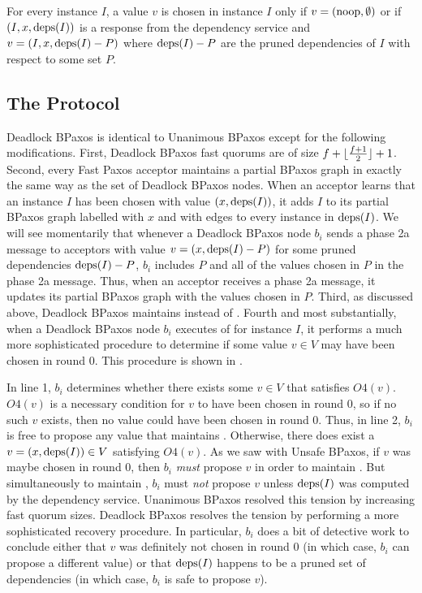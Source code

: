 \begin{invariant}
  For every instance $I$, a value $v$ is chosen in instance $I$ only if $v =
  (\text{noop}, \emptyset)$ or if $(I, x, \text{deps}(I))$ is a response from the
  dependency service and $v = (I, x, \text{deps}(I) - P)$ where $\text{deps}(I) - P$ are
  the pruned dependencies of $I$ with respect to some set $P$.
\end{invariant}

\subsection{The Protocol}
Deadlock BPaxos is identical to Unanimous BPaxos except for the
following modifications.
%
First, Deadlock BPaxos fast quorums are of size $f + \lfloor\frac{f + 1}{2}\rfloor + 1$.
%
Second, every Fast Paxos acceptor maintains a partial BPaxos graph in exactly
the same way as the set of Deadlock BPaxos nodes. When an acceptor learns that
an instance $I$ has been chosen with value $(x, \text{deps}(I))$, it adds $I$ to its
partial BPaxos graph labelled with $x$ and with edges to every instance in
$\text{deps}(I)$. We will see momentarily that whenever a Deadlock BPaxos node $b_i$
sends a phase 2a message to acceptors with value $v = (x, \text{deps}(I) - P)$ for
some pruned dependencies $\text{deps}(I) - P$, $b_i$ includes $P$ and all of the
values chosen in $P$ in the phase 2a message. Thus, when an acceptor receives a
phase 2a message, it updates its partial BPaxos graph with the values chosen in
$P$.
%
Third, as discussed above, Deadlock BPaxos maintains
 instead of .
%
Fourth and most substantially, when a Deadlock BPaxos node $b_i$ executes
 of  for instance $I$, it
performs a much more sophisticated procedure to determine if some value $v \in
V$ may have been chosen in round $0$. This procedure is shown in
.



In line 1, $b_i$ determines whether there exists some $v \in V$ that satisfies
$O4(v)$. $O4(v)$ is a necessary condition for $v$ to have been chosen in round
$0$, so if no such $v$ exists, then no value could have been chosen in round
$0$. Thus, in line 2, $b_i$ is free to propose any value that maintains
.
%
Otherwise, there does exist a $v = (x, \text{deps}(I)) \in V$ satisfying $O4(v)$. As
we saw with Unsafe BPaxos, if $v$ was maybe chosen in round $0$, then $b_i$
\emph{must} propose $v$ in order to maintain . But
simultaneously to maintain , $b_i$ must \emph{not}
propose $v$ unless $\text{deps}(I)$ was computed by the dependency service. Unanimous
BPaxos resolved this tension by increasing fast quorum sizes. Deadlock BPaxos
resolves the tension by performing a more sophisticated recovery procedure.  In
particular, $b_i$ does a bit of detective work to conclude either that $v$ was
definitely not chosen in round $0$ (in which case, $b_i$ can propose a
different value) or that $\text{deps}(I)$ happens to be a pruned set of dependencies
(in which case, $b_i$ is safe to propose $v$).

